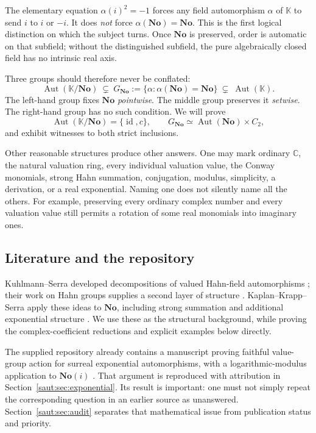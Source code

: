 \documentclass[11pt]{article}
\theoremstyle{definition}
\theoremstyle{remark}
\newcommand{\No}{\mathbf{No}}
\newcommand{\C}{\mathbb C}
\newcommand{\K}{\mathbb K}
\newcommand{\id}{\operatorname{id}}
\newcommand{\Aut}{\operatorname{Aut}}
\numberwithin{equation}{section}
\begin{document}
The elementary equation $\alpha(i)^2=-1$ forces any field automorphism
$\alpha$ of $\K$ to send $i$ to $i$ or $-i$. It does \emph{not} force
$\alpha(\No)=\No$. This is the first logical distinction on which the subject
turns. Once $\No$ is preserved, order is automatic on that subfield; without
the distinguished subfield, the pure algebraically closed field has no
intrinsic real axis.

Three groups should therefore never be conflated:
\begin{equation}\label{saut:eq:three}
 \Aut(\K/\No)\ \subsetneq\
 G_{\No}:=\{\alpha:\alpha(\No)=\No\}\ \subsetneq\ \Aut(\K).
\end{equation}
The left-hand group fixes $\No$ \emph{pointwise}. The middle group preserves
it \emph{setwise}. The right-hand group has no such condition. We will prove
\[
 \Aut(\K/\No)=\{\id,c\},\qquad
 G_{\No}\simeq\Aut(\No)\times C_2,
\]
and exhibit witnesses to both strict inclusions.

Other reasonable structures produce other answers. One may mark ordinary
$\C$, the natural valuation ring, every individual valuation value, the
Conway monomials, strong Hahn summation, conjugation, modulus, simplicity,
a derivation, or a real exponential. Naming one does not silently name all
the others. For example, preserving every ordinary complex number and every
valuation value still permits a rotation of some real monomials into
imaginary ones.

\subsection{Literature and the repository}

Kuhlmann--Serra developed decompositions of valued Hahn-field automorphisms
\cite{KS}; their work on Hahn groups supplies a second layer of structure
\cite{KSG}. Kaplan--Krapp--Serra apply these ideas to $\No$, including
strong summation and additional exponential structure \cite{KKS}. We use
these as the structural background, while proving the complex-coefficient
reductions and explicit examples below directly.

The supplied repository already contains a manuscript proving faithful
value-group action for surreal exponential automorphisms, with a
logarithmic-modulus application to $\No(i)$ \cite{RepoRigidity}. That argument
is reproduced with attribution in Section~\ref{saut:sec:exponential}. Its result
is important: one must not simply repeat the corresponding question in an
earlier source as unanswered. Section~\ref{saut:sec:audit} separates that
mathematical issue from publication status and priority.
\end{document}
